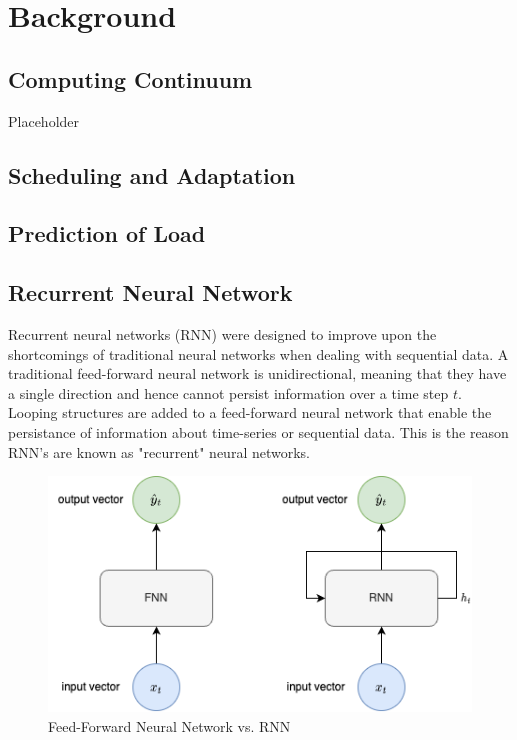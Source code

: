 \chapter{Background}
\label{ch:background}

    \section{Computing Continuum}
    \label{sec:computing-continuum-background}

        Placeholder

    \section{Scheduling and Adaptation}
    \label{sec:scheduling-and-adaptation-background}

    \section{Prediction of Load}
    \label{sec:prediction-of-load-background}

    \section{Recurrent Neural Network}
    \label{sec:rnn-background}

        Recurrent neural networks (RNN) were designed to improve upon the shortcomings of traditional neural networks when dealing with sequential data.
        A traditional feed-forward neural network is unidirectional, meaning that they have a single direction and hence cannot persist information over a time step $t$.
        Looping structures are added to a feed-forward neural network that enable the persistance of information about time-series or sequential data. 
        This is the reason RNN's are known as "recurrent" neural networks.
        \cite{datacloudToolbox}

        \begin{figure}[h!]
            \centering
            \includegraphics[scale=0.5]{figures/FNN_vs_RNN.drawio.png}
            \caption{Feed-Forward Neural Network vs. RNN}
            \label{fig:fnn-vs-rnn}
        \end{figure}

